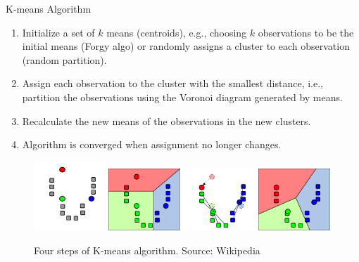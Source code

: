 \documentclass[aspectratio=169]{beamer}
\begin{document}
\begin{frame}{K-means Algorithm}
    \begin{enumerate}
            \item Initialize a set of $k$ means (centroids), e.g., choosing $k$ observations to be the initial means (Forgy algo) or randomly assigns a cluster to each observation (random partition).
            \item Assign each observation to the cluster with the smallest distance, i.e., partition the observations using the Voronoi diagram generated by means.
            \item Recalculate the new means of the observations in the new clusters.
            \item Algorithm is converged when assignment no longer changes.
        \end{enumerate}
        \begin{figure}
            \includegraphics[width=0.24\textwidth]{figures/k-means-step-1.png}
            \includegraphics[width=0.24\textwidth]{figures/k-means-step-2.png}
            \includegraphics[width=0.24\textwidth]{figures/k-means-step-3.png}
            \includegraphics[width=0.24\textwidth]{figures/k-means-step-4.png}
            \caption{Four steps of K-means algorithm. Source: Wikipedia}
        \end{figure}
\end{frame} 
\end{document}
